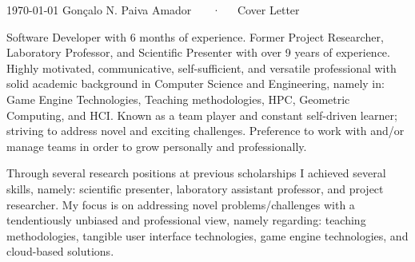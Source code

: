 \documentclass[11pt, a4paper]{awesome-cv}
\begin{document}
\makecvheader[C]

\makecvfooter
  {\today}
  {Gon\c{c}alo N. Paiva Amador ~~~·~~~Cover Letter}
  {}

\makelettertitle

\begin{cvletter}

Software Developer with 6 months of experience.
Former Project Researcher, Laboratory Professor, and Scientific Presenter with over 9 years of experience.
Highly motivated, communicative, self-sufficient, and versatile professional with solid academic background in Computer Science and Engineering, namely in: 
Game Engine Technologies, Teaching methodologies, HPC, Geometric Computing, and HCI.
Known as a team player %
and constant self-driven learner; 
striving to address novel and exciting challenges. %
Preference to work with and/or manage teams in order to grow personally and professionally.


Through several research positions at previous scholarships I achieved several skills, namely: scientific presenter, laboratory assistant professor, and project researcher. 
My focus is on addressing novel problems/challenges with a tendentiously unbiased and professional view, namely regarding: teaching methodologies, tangible user interface technologies, game engine technologies, and cloud-based solutions.



\end{cvletter}
\end{document}
